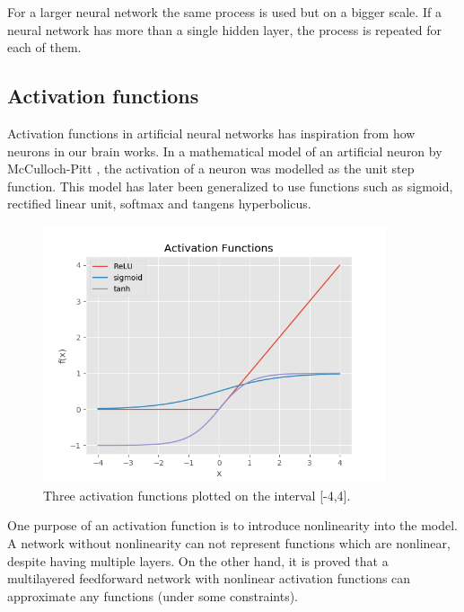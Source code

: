 For a larger neural network the same process is used but on a bigger scale. If a neural network has more than a single hidden layer, the process is repeated for each of them.




\subsection{Activation functions} %
\label{activation_functions}


Activation functions in artificial neural networks has inspiration from how neurons in our brain works. In a mathematical model of an artificial neuron by McCulloch-Pitt \cite{mcculloch_logical_1943}, the activation of a neuron was modelled as the unit step function. This model has later been generalized to use functions such as sigmoid, rectified linear unit, softmax and tangens hyperbolicus. \parencite{jain_artificial_1996}

\begin{figure}[H]
  \centering
    \includegraphics[width=0.9\textwidth]{Assets/Chapter2_Theory/activation_function_overview.png}
    \caption{Three activation functions plotted on the interval [-4,4].}
\end{figure}

One purpose of an activation function is to introduce nonlinearity into the model. A network without nonlinearity can not represent functions which are nonlinear, despite having multiple layers. On the other hand, it is proved that a multilayered feedforward network with nonlinear activation functions can approximate any functions (under some constraints). \cite{leshno_multilayer_1993}

